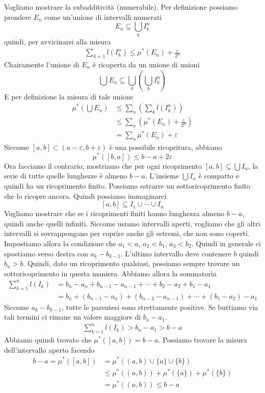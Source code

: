 \documentclass[a4paper]{article}
\begin{document}
Vogliamo mostrare la subadditività (numerabile).
Per definizione possiamo prendere \(E_n\) come un'unione di intervalli numerati
\[
    E_n \subseteq \bigcup_k I^n_k
\]
quindi, per avvicinarsi alla misura
\begin{align*}
    \sum_{k=1} l(I^n_k) \leq \mu^*(E_n) + \frac{\varepsilon}{2^n}
\end{align*}
Chairamente l'unione di \(E_n\) è ricoperta da un unione di unioni
\[
    \bigcup E_n \subseteq \bigcup_n \left(\bigcup_k I_k^n\right)
\]
E per definizione la misura di tale unione
\begin{align*}
    \mu^*\left(\bigcup E_n\right) &\leq \sum_n \left(\sum_k l(I_k^n)\right) \\
    &\leq \sum_n \left(\mu^* (E_n) + \frac{\varepsilon}{2^n}\right) \\
    &= \sum_n \mu^*(E_n) + \varepsilon
\end{align*}
Siccome \([a,b] \subset (a-\varepsilon, b + \varepsilon)\) è una possibile ricopritura,
abbiamo
\[
    \mu^*([b,a]) \leq b-a + 2\varepsilon
\]
Ora facciamo il contrario; mostriamo che per ogni ricoprimento
\([a,b] \subseteq \bigcup I_n\), la serie di tutte quelle lunghezze è almeno \(b-a\).
L'insieme \(\bigcup I_n\) è compatto e quindi ha un ricoprimento finito. Possiamo
estrarre un sottoricoprimento finito che lo ricopre ancora.
Quindi possiamo immaginarci
\[
    [a,b] \subseteq I_1 \cup \cdots \cup I_n
\]
Vogliamo mostrare che se i ricoprimenti finiti hanno lunghezza almeno \(b-a\), quindi anche quelli infiniti.
Siccome usiamo intervalli aperti, vogliamo che gli altri intervalli si sovrappongano per coprire anche gli estremi,
che non sono coperti.
Impostiamo allora la condizione che \(a_1 < a\), \(a_2 < b_1\), \(a_3 < b_2\).
Quindi in generale ci spostiamo verso destra con \(a_k - b_{k-1}\). L'ultimo intervallo
deve contenere \(b\) quindi \(b_n > b\).
Quindi, dato un ricoprimento qualsiasi, possiamo sempre trovare un sottoricoprimento in questa maniera.
Abbiamo allora la sommatoria
\begin{align*}
    \sum_{k=1}^n l(I_k) &= b_n - a_n + b_{n-1} - a_{n-1} + \cdots + b_2 - a_2 + b_1 - a_1 \\
    &= b_n + (b_{n-1} - a_n) + (b_{n-2} - a_{n-1}) + \cdots + (b_1 - a_2) - a_1
\end{align*}
Siccome \(a_k - b_{k-1}\), tutte le parentesi sono strettamente positive.
Se buttiamo via tali termini ci rimane un valore maggiore di \(b_n - a_1\).
\begin{align*}
    \sum_{k=1}^n l(I_k) > b_n - a_1 > b-a
\end{align*}
Abbiamo quindi trovato che \(\mu^*([a,b]) = b-a\).
Possiamo trovare la misura dell'intervallo aperto facendo
\begin{align*}
    b-a = \mu^*([a,b]) &= \mu^*\left((a,b) \cup \{a\} \cup \{b\}\right) \\
    &\leq \mu^*\left((a,b)\right) + \mu^*(\{a\}) + \mu^*(\{b\}) \\
    &= \mu^*\left((a,b)\right) \leq b-a
\end{align*}
\end{document}

